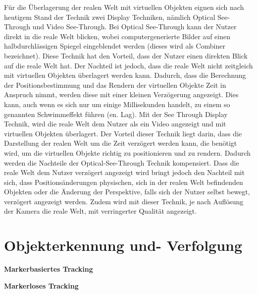 \cite[S.~32]{Tonnis2010} Für die Überlagerung der realen Welt mit virtuellen Objekten eignen sich nach heutigem Stand der Technik zwei Display Techniken, nämlich Optical See-Through und Video See-Through. 
Bei Optical See-Through kann der Nutzer direkt in die reale Welt blicken, wobei computergenerierte Bilder auf einen halbdurchlässigen Spiegel eingeblendet werden (dieses wird als Combiner bezeichnet).
Diese Technik hat den Vorteil, dass der Nutzer einen direkten Blick auf die reale Welt hat. Der Nachteil ist jedoch, dass die reale Welt nicht zeitgleich mit virtuellen Objekten überlagert werden kann. 
Dadurch, dass die Berechnung der Positionsbestimmung und das Rendern der virtuellen Objekte Zeit in Anspruch nimmt, werden diese mit einer kleinen Verzögerung angezeigt. Dies kann, auch 
wenn es sich nur um einige Millisekunden handelt, zu einem so genannten Schwimmeffekt führen (en. Lag). Mit der See Through Display Technik, wird die reale Welt dem Nutzer als ein Video 
angezeigt und mit virtuellen Objekten überlagert. Der Vorteil dieser Technik liegt darin, dass die Darstellung der realen Welt um die Zeit verzögert werden kann, die benötigt wird, um die virtuellen Objekte 
richtig zu positionieren und zu rendern. Dadurch werden die Nachteile der Optical-See-Through Technik kompensiert. Dass die reale Welt dem Nutzer verzögert angezeigt wird bringt jedoch den Nachteil mit sich, 
dass Positionsänderungen physischen, sich in der realen Welt befindenden Objekten oder die Änderung der Perspektive, falls sich der Nutzer selbst bewegt, verzögert angezeigt werden. Zudem wird mit 
dieser Technik, je nach Auflösung der Kamera die reale Welt, mit verringerter Qualität angezeigt.

\section{Objekterkennung und- Verfolgung}



\textbf{Markerbasiertes Tracking}



\textbf{Markerloses Tracking}




